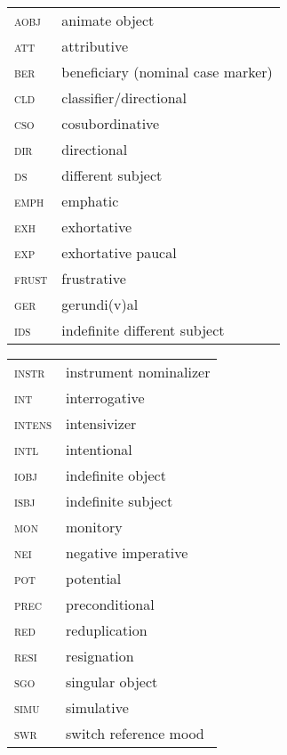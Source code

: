 \documentclass[output=paper,
modfonts,nonflat
]{langsci/langscibook}
\begin{document}
\begin{tabularx}{.45\textwidth}{lQ}
\textsc{aobj } & animate object \\
\textsc{att } & attributive \\
\textsc{ber } & beneficiary (nominal case marker)\\
\textsc{cld } & classifier/directional\\
\textsc{cso } & cosubordinative\\
\textsc{dir } & directional \\
\textsc{ds } & different subject\\
\textsc{emph } & emphatic \\
\textsc{exh } & exhortative \\
\textsc{exp } & exhortative paucal \\
\textsc{frust } & frustrative \\
\textsc{ger } & gerundi(v)al\\
\textsc{ids } & indefinite different subject \\
\end{tabularx}
\begin{tabularx}{.5\textwidth}{lQ}
\textsc{instr } & instrument nominalizer \\
\textsc{int } & interrogative \\
\textsc{intens } & intensivizer \\
\textsc{intl } & intentional \\
\textsc{iobj } & indefinite object \\
\textsc{isbj } & indefinite subject \\
\textsc{mon } & monitory \\
\textsc{nei } & negative imperative \\
\textsc{pot } & potential \\
\textsc{prec } & preconditional \\
\textsc{red } & reduplication \\
\textsc{resi } & resignation \\
\textsc{sgo } & singular object \\
\textsc{simu } & simulative \\
\textsc{swr } & switch reference mood\\
\end{tabularx}

{\sloppy
\printbibliography[heading=subbibliography,notkeyword=this]
}
\end{document}
